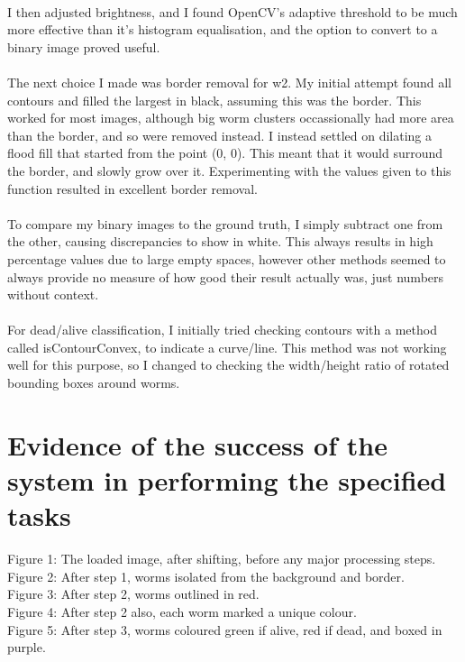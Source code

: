 \documentclass[a4paper,12pt]{article}
\begin{document}
\\
I then adjusted brightness, and I found OpenCV's adaptive threshold to be much more effective than it's histogram equalisation, and the option to convert to a binary image proved useful.
\\\\
The next choice I made was border removal for w2. My initial attempt found all contours and filled the largest in black, assuming this was the border. This worked for most images, although big worm clusters occassionally had more area than the border, and so were removed instead. I instead settled on dilating a flood fill that started from the point (0, 0). This meant that it would surround the border, and slowly grow over it. Experimenting with the values given to this function resulted in excellent border removal.
\\\\
To compare my binary images to the ground truth, I simply subtract one from the other, causing discrepancies to show in white. This always results in high percentage values due to large empty spaces, however other methods seemed to always provide no measure of how good their result actually was, just numbers without context.
\\\\
For dead/alive classification, I initially tried checking contours with a method called isContourConvex, to indicate a curve/line. This method was not working well for this purpose, so I changed to checking the width/height ratio of rotated bounding boxes around worms.

\section*{Evidence of the success of the system in performing the specified tasks}
Figure 1: The loaded image, after shifting, before any major processing steps.\\
Figure 2: After step 1, worms isolated from the background and border.\\
Figure 3: After step 2, worms outlined in red.\\
Figure 4: After step 2 also, each worm marked a unique colour.\\
Figure 5: After step 3, worms coloured green if alive, red if dead, and boxed in purple.
\end{document}

